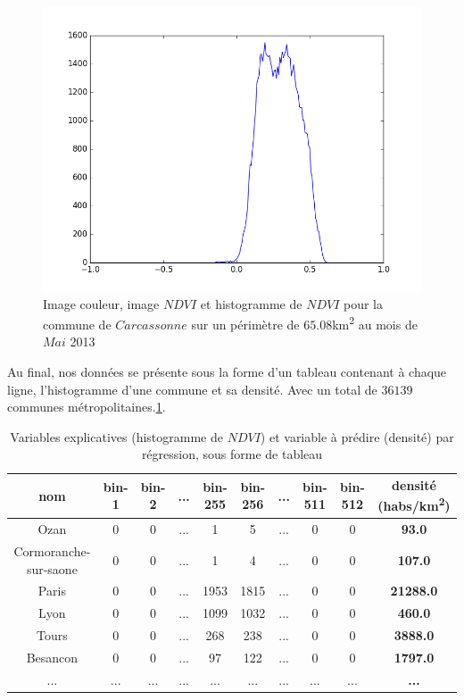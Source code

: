 \documentclass{book}
\begin{document}
\begin{figure}[H]
{}
\begin{center}
\includegraphics[scale=0.45]{images/05_ndvi_histo.png}
\end{center}
\caption{Image couleur, image $NDVI$ et histogramme de $NDVI$ pour la commune de $Carcassonne$ sur un périmètre de $65.08$km\textsuperscript{2} au mois de $Mai$ 2013}
\label{ndvi_extraction}
\end{figure}

\clearpage

Au final, nos données se présente sous la forme d'un tableau contenant à chaque ligne, l'histogramme d'une commune et sa densité. Avec un total
de $36139$ communes métropolitaines.\ref{data_reg}.

\begin{table}[H]
\begin{center}
\begin{adjustbox}{max width=\textwidth}
\begin{tabular}{|c|c|c|c|c|c|c|c|c|>{\bfseries}c|}

\hline 
nom &  bin-1 & bin-2 & ... & bin-255 & bin-256 &... & bin-511 & bin-512 & densité (habs/km\textsuperscript{2}) \\
\hline 
Ozan & 0 & 0 & ... & 1 & 5 & ... & 0 & 0 & 93.0\\
\hline 
Cormoranche-sur-saone & 0 & 0 & ... & 1 & 4 & ... & 0 & 0 & 107.0\\
\hline 
Paris & 0 & 0 & ... & 1953 & 1815 & ... & 0 & 0 & 21288.0\\
\hline
Lyon & 0 & 0 & ... & 1099 & 1032 & ... & 0 & 0 & 460.0\\
\hline
Tours & 0 & 0 & ... & 268 & 238 & ... & 0 & 0 & 3888.0\\
\hline
Besancon & 0 & 0 & ... & 97 & 122 & ... & 0 & 0 & 1797.0\\
\hline 
... & ... & ... & ... & ... & ... & ... & ... & ... & ... \\
\hline
\end{tabular}
\end{adjustbox}
\end{center}
\caption{Variables explicatives (histogramme de $NDVI$) et variable à prédire (densité) par régression, sous forme de tableau}
\label{data_reg}
\end{table}
\end{document}
